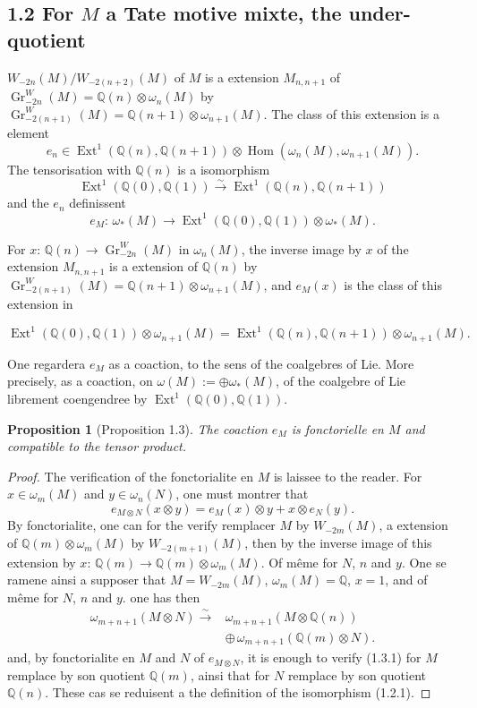 \documentclass[11pt,a4paper]{article}
\theoremstyle{plain}
\newtheorem{proposition}[theorem]{Proposition}
\theoremstyle{definition}
\theoremstyle{remark}
\DeclareMathOperator{\Ext}{Ext}
\DeclareMathOperator{\Hom}{Hom}
\DeclareMathOperator{\Gr}{Gr}
\newcommand{\dbQ}{\mathbb{Q}}
\newcommand{\simover}{\xrightarrow{\sim}}
\providecommand{\Hom}{\operatorname{Hom}}
\providecommand{\Ext}{\operatorname{Ext}}
\begin{document}
\subsection*{1.2 For $M$ a Tate motive mixte, the under-quotient}
$W_{-2n}(M)/W_{-2(n+2)}(M)$ of
$M$ is a extension $M_{n,n+1}$ of
$\Gr_{-2n}^W(M)=\dbQ(n)\otimes\omega_n(M)$ by
$\Gr_{-2(n+1)}^W(M)=\dbQ(n+1)\otimes\omega_{n+1}(M)$.
The class of this extension is a element
\begin{equation}
e_n\in \Ext^1(\dbQ(n),\dbQ(n+1))\otimes\Hom
(\omega_n(M),\omega_{n+1}(M)).
\end{equation}
The tensorisation with $\dbQ(n)$ is a
isomorphism
\begin{equation}
\Ext^1(\dbQ(0),\dbQ(1))\simover
\Ext^1(\dbQ(n),\dbQ(n+1))\tag{1.2.1}
\end{equation}
and the $e_n$ definissent
\begin{equation}
e_M\colon\,\omega_*(M)\to\Ext^1(\dbQ(0),
\dbQ(1))\otimes\omega_*(M).
\tag{1.2.2}
\end{equation}


For $x\colon\,\dbQ(n)\to\Gr_{-2n}^W(M)$ in
$\omega_n(M)$, the inverse image by $x$ of
the extension $M_{n,n+1}$ is a extension of
$\dbQ(n)$ by $\Gr_{-2(n+1)}^W(M)=\dbQ(n+1)
\otimes\omega_{n+1}(M)$, and $e_M(x)$ is the
class of this extension in

\[
\Ext^1(\dbQ(0),\dbQ(1))\otimes\omega_{n+1}(M)
=\Ext^1(\dbQ(n),\dbQ(n+1))\otimes\omega_{n+1}(M).
\]

One regardera $e_M$ as a coaction, to the sens
of the coalgebres of Lie.
More precisely, as a coaction, on
$\omega(M):=\oplus \omega_*(M)$, of the
coalgebre of Lie librement coengendree by
$\Ext^1(\dbQ(0),\dbQ(1))$.

\begin{proposition}[Proposition 1.3]The coaction $e_M$ is fonctorielle en $M$ and
compatible to the tensor product.\end{proposition}
\begin{proof}[Proof]The verification of the fonctorialite en $M$
is laissee to the reader.
For $x\in\omega_m(M)$ and $y\in\omega_n(N)$, one
must montrer that
\begin{equation}
e_{M\otimes N}(x\otimes y)=e_M(x)\otimes y
+x\otimes e_N(y).
\tag{1.3.1}
\end{equation}
By fonctorialite, one can for the
verify remplacer $M$ by $W_{-2m}(M)$, a
extension of $\dbQ(m)\otimes\omega_m(M)$ by
$W_{-2(m+1)}(M)$, then by the inverse image of
this extension by
$x\colon\,\dbQ(m)\to\dbQ(m)\otimes\omega_m(M)$.
Of m\^{e}me for $N$, $n$ and $y$.
One se ramene ainsi a supposer that
$M=W_{-2m}(M)$, $\omega_m(M)=\dbQ$, $x=1$, and
of m\^{e}me for $N$, $n$ and $y$.
one has then
\begin{align}
\omega_{m+n+1}(M\otimes N)\simover
  &\omega_{m+n+1}(M\otimes\dbQ(n))\\
  &\oplus\,\omega_{m+n+1}(\dbQ(m)\otimes N).
\end{align}
and, by fonctorialite en $M$ and $N$ of
$e_{M\otimes N}$, it is enough to verify
(1.3.1) for $M$ remplace by son quotient
$\dbQ(m)$, ainsi that for $N$ remplace by
son quotient $\dbQ(n)$.
These cas se reduisent a the definition of
the isomorphism (1.2.1).\end{proof}
\end{document}
